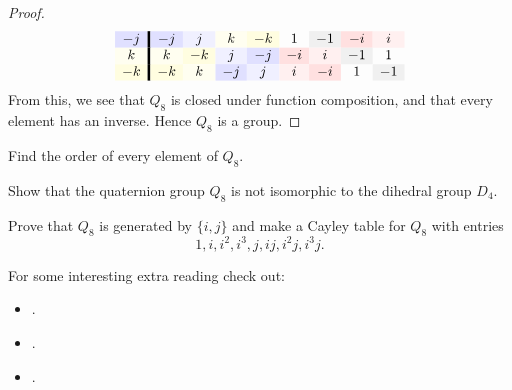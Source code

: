 \documentclass{ximera}
\begin{document}
\begin{example}
\begin{proof}
\begin{gather*}
\begin{array}{c!{\vline width 2pt}cccccccc}
      -j \cellcolor{blue!12!white}& -j \cellcolor{blue!12!white} & j \cellcolor{blue!6!white} & k \cellcolor{yellow!6!white}  & -k\cellcolor{yellow!12!white} & 1  & -1 \cellcolor{black!6!white} & -i \cellcolor{red!12!white} & i \cellcolor{red!6!white} \\
      k \cellcolor{yellow!6!white}& k \cellcolor{yellow!6!white} & -k \cellcolor{yellow!12!white} & j \cellcolor{blue!6!white}  & -j\cellcolor{blue!12!white} & -i \cellcolor{red!12!white} & i\cellcolor{red!6!white}  & -1 \cellcolor{black!6!white} & 1  \\
      -k \cellcolor{yellow!12!white}& -k \cellcolor{yellow!12!white} & k \cellcolor{yellow!6!white} & -j \cellcolor{blue!12!white}  & j\cellcolor{blue!6!white} & i \cellcolor{red!6!white} & -i\cellcolor{red!12!white}  & 1 & -1 \cellcolor{black!6!white}
    \end{array}
    \end{gather*}
    From this, we see that $Q_8$ is closed under function composition,
    and that every element has an inverse. Hence $Q_8$ is a group.
  \end{proof}
\end{example}

\begin{exercise}
  Find the order of every element of $Q_8$.
\end{exercise}


\begin{exercise}
   Show that the quaternion group $Q_8$ is not isomorphic to the
   dihedral group $D_4$.
\end{exercise}

\begin{exercise}
  Prove that $Q_8$ is generated by $\{i, j\}$ and make a Cayley table
  for $Q_8$ with entries
  \[
  1, i, i^2, i^3, j, ij, i^2j, i^3j.
  \]
\end{exercise}


For some interesting extra reading check out:
\begin{itemize}
\item {}.
\item {}.%
\item {}.
\end{itemize}
\end{document}
